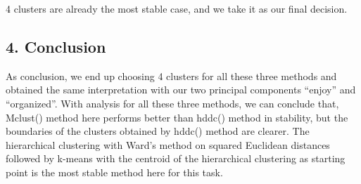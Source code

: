 \documentclass[
  11pt,
]{article}
\begin{document}
4 clusters are already the most stable case, and we take it as our final decision.

\hypertarget{conclusion}{%
\subsection{4. Conclusion}\label{conclusion}}

As conclusion, we end up choosing 4 clusters for all these three methods and obtained the same interpretation with our two principal components ``enjoy'' and ``organized''.
With analysis for all these three methods, we can conclude that, Mclust() method here performs better than hddc() method in stability, but the boundaries of the clusters obtained by hddc() method are clearer. The hierarchical clustering with Ward's method on squared Euclidean distances followed by k-means with the centroid of the hierarchical clustering as starting point is the most stable method here for this task.
\end{document}
